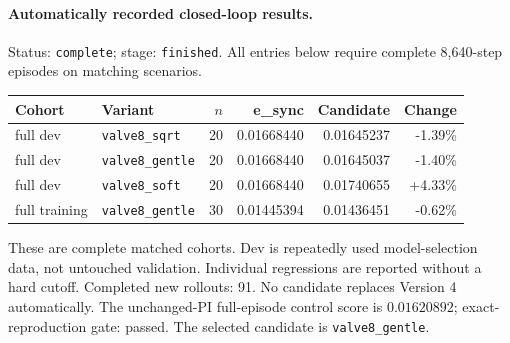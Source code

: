 \paragraph{Automatically recorded closed-loop results.}
Status: \texttt{complete}; stage: \texttt{finished}.
All entries below require complete 8,640-step episodes on matching scenarios.
\begin{center}\small
\begin{tabular}{llrrrr}\toprule
Cohort & Variant & $n$ & e\_sync & Candidate & Change \\\midrule
full dev & \texttt{valve8\_sqrt} & 20 & 0.01668440 & 0.01645237 & -1.39\% \\
full dev & \texttt{valve8\_gentle} & 20 & 0.01668440 & 0.01645037 & -1.40\% \\
full dev & \texttt{valve8\_soft} & 20 & 0.01668440 & 0.01740655 & +4.33\% \\
full training & \texttt{valve8\_gentle} & 30 & 0.01445394 & 0.01436451 & -0.62\% \\
\bottomrule\end{tabular}\end{center}
These are complete matched cohorts. Dev is repeatedly used model-selection data, not untouched validation. Individual regressions are reported without a hard cutoff.
Completed new rollouts: 91. No candidate replaces Version 4 automatically.
The unchanged-PI full-episode control score is $0.01620892$; exact-reproduction gate: passed.
The selected candidate is \texttt{valve8\_gentle}.
